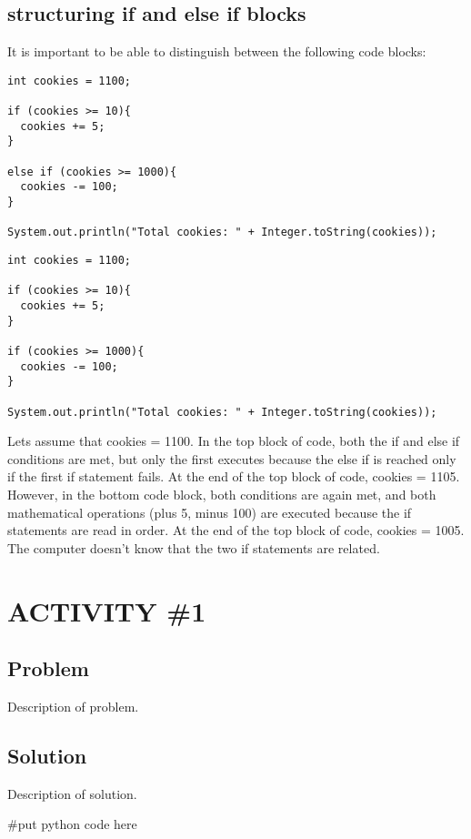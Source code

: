 \documentclass[14pt]{extreport}%
\begin{document}
\subsection*{structuring if and else if blocks}
It is important to be able to distinguish between the following code blocks:
\begin{lstlisting}
int cookies = 1100;

if (cookies >= 10){
  cookies += 5;
}

else if (cookies >= 1000){
  cookies -= 100;
}

System.out.println("Total cookies: " + Integer.toString(cookies));
\end{lstlisting}{}

\begin{lstlisting}
int cookies = 1100;

if (cookies >= 10){
  cookies += 5;
}

if (cookies >= 1000){
  cookies -= 100;
}

System.out.println("Total cookies: " + Integer.toString(cookies));
\end{lstlisting}{}

Lets assume that cookies = 1100. In the top block of code, both the if and else if conditions are met, but only the first executes because the else if is reached only if the first if statement fails. At the end of the top block of code, cookies = 1105. However, in the bottom code block, both
conditions are again met, and both mathematical operations (plus 5, minus
100) are executed because the if statements are read in order. At the end of
the top block of code, cookies = 1005. The computer doesn't know
that the two if statements are related.


\section*{ACTIVITY \#1} 
\subsection*{Problem}
Description of problem.
\subsection*{Solution}
Description of solution.\\
\begin{python}
#put python code here

\end{python}
\end{document}
